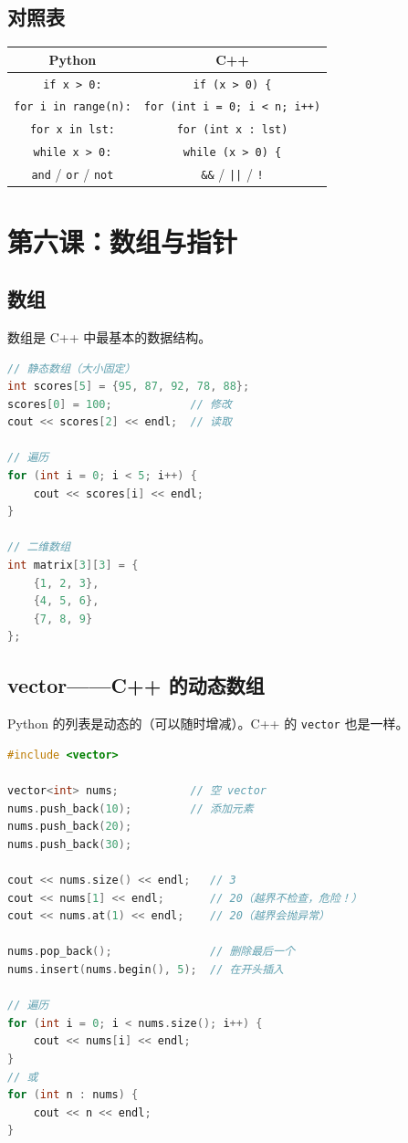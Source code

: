 \documentclass[a4paper,12pt]{ctexart}
\begin{document}
\subsection*{对照表}

\begin{center}
\begin{tabular}{|c|c|}
\hline
\textbf{Python} & \textbf{C++} \\ \hline
\texttt{if x > 0:} & \texttt{if (x > 0) \{} \\ \hline
\texttt{for i in range(n):} & \texttt{for (int i = 0; i < n; i++)} \\ \hline
\texttt{for x in lst:} & \texttt{for (int x : lst)} \\ \hline
\texttt{while x > 0:} & \texttt{while (x > 0) \{} \\ \hline
\texttt{and} / \texttt{or} / \texttt{not} & \texttt{\&\&} / \texttt{||} / \texttt{!} \\ \hline
\end{tabular}
\end{center}

\section*{第六课：数组与指针}

\subsection*{数组}

数组是 C++ 中最基本的数据结构。

\begin{lstlisting}[language=C++]
// 静态数组（大小固定）
int scores[5] = {95, 87, 92, 78, 88};
scores[0] = 100;            // 修改
cout << scores[2] << endl;  // 读取

// 遍历
for (int i = 0; i < 5; i++) {
    cout << scores[i] << endl;
}

// 二维数组
int matrix[3][3] = {
    {1, 2, 3},
    {4, 5, 6},
    {7, 8, 9}
};
\end{lstlisting}

\subsection*{vector——C++ 的动态数组}

Python 的列表是动态的（可以随时增减）。C++ 的 \texttt{vector} 也是一样。

\begin{lstlisting}[language=C++]
#include <vector>

vector<int> nums;           // 空 vector
nums.push_back(10);         // 添加元素
nums.push_back(20);        
nums.push_back(30);

cout << nums.size() << endl;   // 3
cout << nums[1] << endl;       // 20（越界不检查，危险！）
cout << nums.at(1) << endl;    // 20（越界会抛异常）

nums.pop_back();               // 删除最后一个
nums.insert(nums.begin(), 5);  // 在开头插入

// 遍历
for (int i = 0; i < nums.size(); i++) {
    cout << nums[i] << endl;
}
// 或
for (int n : nums) {
    cout << n << endl;
}
\end{lstlisting}
\end{document}
